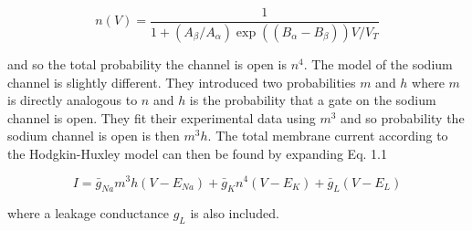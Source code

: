 \documentclass[a4paper,11pt]{book}
\begin{document}
\begin{equation}
n(V) = \frac{1}{1+(A_{\beta}/A_{\alpha})\exp ((B_{\alpha} - B_{\beta}))V/V_{T}}
\end{equation}

and so the total probability the channel is open is $n^{4}$. The model of the sodium channel is slightly different. They introduced two probabilities $m$ and $h$ where $m$ is directly analogous to $n$ and $h$ is the probability that a gate on the sodium channel is open. They fit their experimental data using $m^{3}$ and so  probability the sodium channel is open is then $m^{3}h$. The total membrane current according to the Hodgkin-Huxley model can then be found by expanding Eq. 1.1

\begin{equation}
I = \bar{g}_{Na}m^{3}h(V-E_{Na}) + \bar{g}_{K}n^{4}(V-E_{K}) + \bar{g}_{L}(V-E_{L})
\end{equation}

where a leakage conductance $g_{L}$ is also included.
\end{document}
